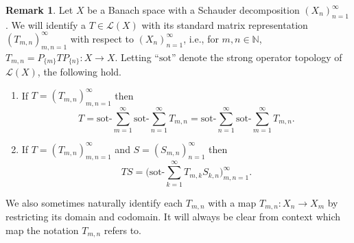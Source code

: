 \documentclass[11pt]{amsart}
\theoremstyle{definition}
\newtheorem{remark}[theorem]{Remark}
\newcommand{\N}{\mathbb{N}}
\numberwithin{equation}{section}
\begin{document}
\begin{remark}
Let $X$ be a Banach space with a Schauder decomposition $(X_n)_{n=1}^\infty$. We will identify a $T\in\mathcal{L}(X)$ with its standard matrix representation $(T_{m,n})_{m,n=1}^\infty$ with respect to $(X_n)_{n=1}^\infty$, i.e., for $m,n\in\N$, $T_{m,n} = P_{\{m\}}TP_{\{n\}}:X\to X$. Letting ``$\mathrm{sot}$'' denote the strong operator topology of $\mathcal{L}(X)$, the following hold.
\begin{enumerate}[leftmargin=19pt,label=(\roman*)]
    
    \item If $T = (T_{m,n})_{m,n=1}^\infty$ then
\[T =\mathrm{sot}\text{-}\sum_{m=1}^\infty\mathrm{sot}\text{-}\sum_{n=1}^\infty T_{m,n} = \mathrm{sot}\text{-}\sum_{n=1}^\infty\mathrm{sot}\text{-}\sum_{m=1}^\infty T_{m,n}.\]

\item If $T = (T_{m,n})_{m,n=1}^\infty$ and $S = (S_{m,n})_{n=1}^\infty$ then
\[TS = \Big(\mathrm{sot}\text{-}\sum_{k=1}^\infty T_{m,k}S_{k,n}\Big)_{m,n=1}^\infty.\]

\end{enumerate}
We also sometimes naturally identify each $T_{m,n}$ with a map $T_{m,n}:X_n\to X_m$ by restricting its domain and codomain. It will always be clear from context which map the notation $T_{m,n}$ refers to.
\end{remark}
\end{document}
